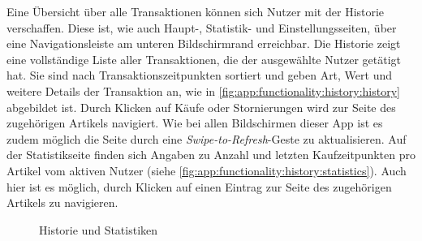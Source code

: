 Eine Übersicht über alle Transaktionen können sich Nutzer mit der Historie verschaffen.
Diese ist, wie auch Haupt-, Statistik- und Einstellungsseiten, über eine Navigationsleiste am unteren Bildschirmrand erreichbar.
Die Historie zeigt eine vollständige Liste aller Transaktionen, die der ausgewählte Nutzer getätigt hat.
Sie sind nach Transaktionszeitpunkten sortiert und geben Art, Wert und weitere Details der Transaktion an, wie in \autoref{fig:app:functionality:history:history} abgebildet ist.
Durch Klicken auf Käufe oder Stornierungen wird zur Seite des zugehörigen Artikels navigiert.
Wie bei allen Bildschirmen dieser App ist es zudem möglich die Seite durch eine \textit{Swipe-to-Refresh}-Geste zu aktualisieren.
Auf der Statistikseite finden sich Angaben zu Anzahl und letzten Kaufzeitpunkten pro Artikel vom aktiven Nutzer (siehe \autoref{fig:app:functionality:history:statistics}).
Auch hier ist es möglich, durch Klicken auf einen Eintrag zur Seite des zugehörigen Artikels zu navigieren.
\begin{figure}%
	\centering
	\qquad
	\caption{Historie und Statistiken}%
	\label{fig:app:functionality:history}%
\end{figure}

